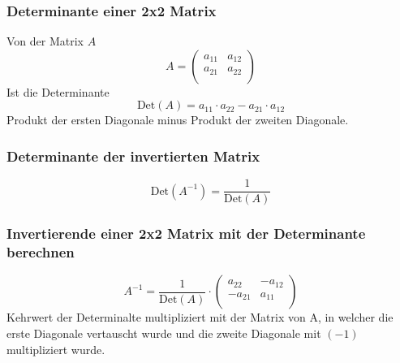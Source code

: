 \subsubsection{Determinante einer 2x2 Matrix}
Von der Matrix $A$
\[ A =
  \begin {pmatrix}
    a_{11} & a_{12} \\
    a_{21} & a_{22} \\
  \end {pmatrix} \]
Ist die Determinante
\[ \text{Det}(A) = 
    a_{11} \cdot a_{22} - a_{21} \cdot a_{12} \]
Produkt der ersten Diagonale minus Produkt der zweiten Diagonale.

\subsubsection{Determinante der invertierten Matrix}
$$ \text{Det}(A^{-1}) = \frac{1}{\text{Det}(A)} $$

\subsubsection{Invertierende einer 2x2 Matrix mit der Determinante berechnen}
\[ A^{-1} = \frac{1}{\text{Det}(A)} \cdot 
  \begin {pmatrix}
    a_{22} & -a_{12} \\
    -a_{21} & a_{11} \\
  \end {pmatrix} \]
Kehrwert der Determinalte multipliziert mit der Matrix von A, in welcher
die erste Diagonale vertauscht wurde und die zweite Diagonale mit $(-1)$
multipliziert wurde.

